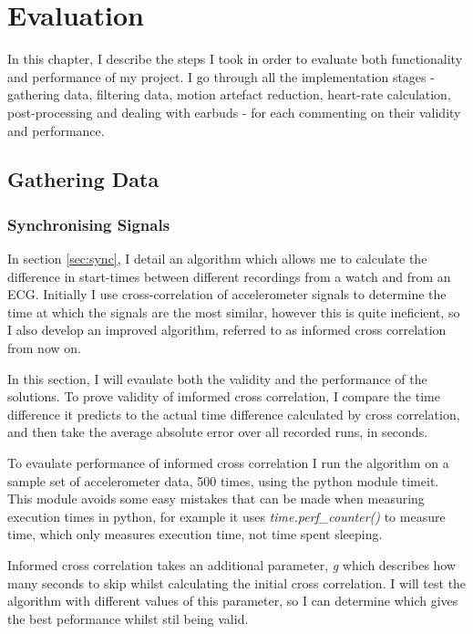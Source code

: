\documentclass[12pt,a4paper,twoside,openright]{report}
\begin{document}
\chapter{Evaluation}

In this chapter, I describe the steps I took in order to evaluate both
functionality and performance of my project. I go through all the
implementation stages - gathering data, filtering data, motion artefact
reduction, heart-rate calculation, post-processing and dealing with earbuds -
for each commenting on their validity and performance.

\section{Gathering Data}

\subsection{Synchronising Signals} \label{sec:evaluate-sync}

In section \ref{sec:sync}, I detail an algorithm which allows me to
calculate the difference in start-times between different recordings from a
watch and from an ECG. Initially I use cross-correlation of accelerometer signals to
determine the time at which the signals are the most similar, however this is
quite ineficient, so I also develop an improved algorithm, referred to as
informed cross correlation from now on.

In this section, I will evaulate both the validity and the performance of the
solutions. To prove validity of imformed cross correlation, I compare the
time difference it predicts to the actual time difference calculated by cross
correlation, and then take the average absolute error over all recorded runs,
in seconds. 

To evaulate performance of informed cross correlation I run the
algorithm on a sample set of accelerometer data, 500 times, using the python
module timeit. This module avoids some easy mistakes that can be made when
measuring execution times in python, for example it uses
\emph{time.perf\_counter()} to measure time, which only measures execution
time, not time spent sleeping.

Informed cross correlation takes an additional parameter,
\emph{g} which describes how many seconds to skip whilst
calculating the initial cross correlation. I will test the algorithm with different
values of this parameter, so I can determine which gives the best peformance
whilst stil being valid. 
\end{document}
